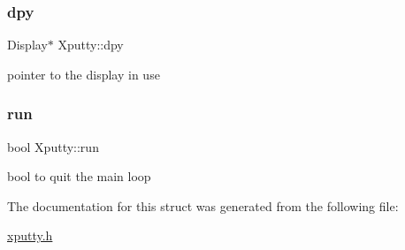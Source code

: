 \subsubsection{\texorpdfstring{dpy}{dpy}}
{\footnotesize\ttfamily Display$\ast$ Xputty\+::dpy}

pointer to the display in use \mbox{\label{structXputty_a3a8e0381e77ae9fae69aab5dda8e7e7a}} 
\subsubsection{\texorpdfstring{run}{run}}
{\footnotesize\ttfamily bool Xputty\+::run}

bool to quit the main loop 

The documentation for this struct was generated from the following file\+:\begin{DoxyCompactItemize}
\item 
\hyperlink{xputty_8h}{xputty.\+h}\end{DoxyCompactItemize}
